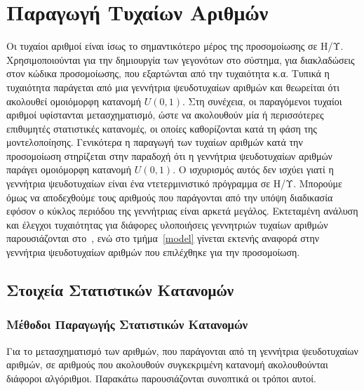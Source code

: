 \documentclass[12pt]{report}
\begin{document}
\section{Παραγωγή Τυχαίων Αριθμών}
Οι τυχαίοι αριθμοί είναι ίσως το σημαντικότερο μέρος της προσομοίωσης σε Η/Υ. Χρησιμοποιούνται για την δημιουργία των γεγονότων στο σύστημα, για διακλαδώσεις στον κώδικα προσομοίωσης, που εξαρτώνται από την τυχαιότητα κ.α. Τυπικά η τυχαιότητα παράγεται από μια γεννήτρια ψευδοτυχαίων αριθμών και θεωρείται ότι ακολουθεί ομοιόμορφη κατανομή \(U(0, 1)\). Στη συνέχεια, οι παραγόμενοι τυχαίοι αριθμοί υφίστανται μετασχηματισμό, ώστε να ακολουθούν μία ή περισσότερες επιθυμητές στατιστικές κατανομές, οι οποίες καθορίζονται κατά τη φάση της μοντελοποίησης. Γενικότερα η παραγωγή των τυχαίων αριθμών κατά την προσομοίωση στηρίζεται στην παραδοχή ότι η γεννήτρια ψευδοτυχαίων αριθμών παράγει ομοιόμορφη κατανομή \(U(0, 1)\). Ο ισχυρισμός αυτός δεν ισχύει γιατί η γεννήτρια ψευδοτυχαίων είναι ένα ντετερμινιστικό πρόγραμμα σε Η/Υ. Μπορούμε όμως να αποδεχθούμε τους αριθμούς που παράγονται από την υπόψη διαδικασία εφόσον ο κύκλος περιόδου της γεννήτριας είναι αρκετά μεγάλος. Εκτεταμένη ανάλυση και έλεγχοι τυχαιότητας για διάφορες υλοποιήσεις γεννητριών τυχαίων αριθμών παρουσιάζονται στο~\cite{book:06}, ενώ στο τμήμα~\ref{model} γίνεται εκτενής αναφορά στην γεννήτρια ψευδοτυχαίων αριθμών που επιλέχθηκε για την προσομοίωση.

\subsection{Στοιχεία Στατιστικών Κατανομών}
\subsubsection{Μέθοδοι Παραγωγής Στατιστικών Κατανομών}
Για το μετασχηματισμό των αριθμών, που παράγονται από τη γεννήτρια ψευδοτυχαίων αριθμών, σε αριθμούς που ακολουθούν συγκεκριμένη κατανομή ακολουθούνται διάφοροι αλγόριθμοι. Παρακάτω παρουσιάζονται συνοπτικά οι τρόποι αυτοί.
\end{document}
